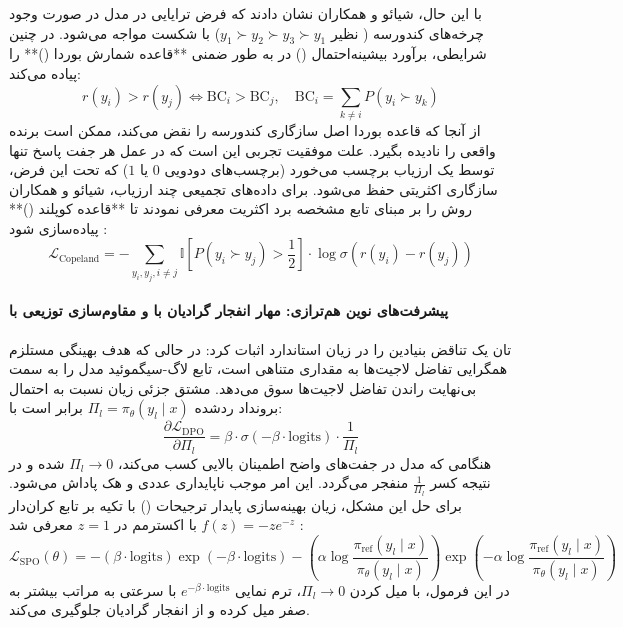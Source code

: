 با این حال، شیائو و همکاران \cite{xiao2025theoretical} نشان دادند که فرض ترایایی در مدل  در صورت وجود چرخه‌های کندورسه ( نظیر $y_1 \succ y_2 \succ y_3 \succ y_1$) با شکست مواجه می‌شود. در چنین شرایطی، برآورد بیشینه‌احتمال () در  به طور ضمنی **قاعده شمارش بوردا ()** را پیاده می‌کند:
\begin{equation}
    r(y_i) > r(y_j) \iff \text{BC}_i > \text{BC}_j, \quad \text{BC}_i = \sum_{k \ne i} P(y_i \succ y_k)
\end{equation}
از آنجا که قاعده بوردا اصل سازگاری کندورسه را نقض می‌کند،  ممکن است برنده واقعی را نادیده بگیرد. علت موفقیت تجربی  این است که در عمل هر جفت پاسخ تنها توسط یک ارزیاب برچسب می‌خورد (برچسب‌های دودویی $0$ یا $1$) که تحت این فرض، سازگاری اکثریتی حفظ می‌شود. برای داده‌های تجمیعی چند ارزیاب، شیائو و همکاران روش  را بر مبنای تابع مشخصه برد اکثریت معرفی نمودند تا **قاعده کوپلند ()** پیاده‌سازی شود \cite{xiao2025theoretical}:
\begin{equation}
    \mathcal{L}_{\text{Copeland}} = - \sum_{y_i, y_j, i \ne j} \mathbb{I}\left[ P(y_i \succ y_j) > \frac{1}{2} \right] \cdot \log \sigma(r(y_i) - r(y_j))
\end{equation}

\paragraph*{پیشرفت‌های نوین هم‌ترازی: مهار انفجار گرادیان با  و مقاوم‌سازی توزیعی با }
تان \cite{tan2025principled} یک تناقض بنیادین را در زیان  استاندارد اثبات کرد: در حالی که هدف بهینگی مستلزم همگرایی تفاضل لاجیت‌ها به مقداری متناهی است، تابع لاگ-سیگموئید  مدل را به سمت بی‌نهایت راندن تفاضل لاجیت‌ها سوق می‌دهد. مشتق جزئی زیان  نسبت به احتمال برونداد ردشده $\Pi_l = \pi_\theta(y_l \mid x)$ برابر است با:
\begin{equation}
    \frac{\partial \mathcal{L}_{\text{DPO}}}{\partial \Pi_l} = \beta \cdot \sigma(-\beta \cdot \text{logits}) \cdot \frac{1}{\Pi_l}
\end{equation}
هنگامی که مدل در جفت‌های واضح اطمینان بالایی کسب می‌کند، $\Pi_l \to 0$ شده و در نتیجه کسر $\frac{1}{\Pi_l}$ منفجر می‌گردد. این امر موجب ناپایداری عددی و هک پاداش می‌شود. برای حل این مشکل، زیان بهینه‌سازی پایدار ترجیحات () با تکیه بر تابع کران‌دار $f(z) = -z e^{-z}$ با اکسترمم در $z=1$ معرفی شد \cite{tan2025principled}:
\begin{equation}
    \mathcal{L}_{\text{SPO}}(\theta) = - (\beta \cdot \text{logits}) \exp(-\beta \cdot \text{logits}) - \left( \alpha \log \frac{\pi_{\text{ref}}(y_l \mid x)}{\pi_\theta(y_l \mid x)} \right) \exp\left(-\alpha \log \frac{\pi_{\text{ref}}(y_l \mid x)}{\pi_\theta(y_l \mid x)}\right)
\end{equation}
در این فرمول، با میل کردن $\Pi_l \to 0$، ترم نمایی $e^{-\beta \cdot \text{logits}}$ با سرعتی به مراتب بیشتر به صفر میل کرده و از انفجار گرادیان جلوگیری می‌کند.

